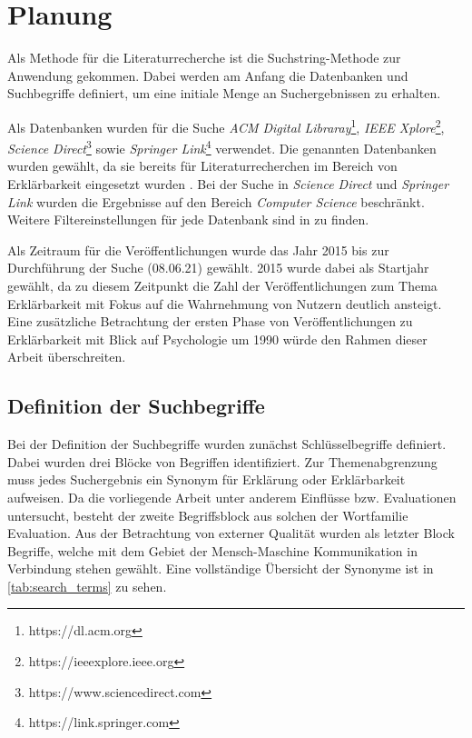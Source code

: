 \section{Planung}

Als Methode für die Literaturrecherche ist die Suchstring-Methode zur Anwendung gekommen. Dabei werden am Anfang die Datenbanken und Suchbegriffe definiert, um eine initiale Menge an Suchergebnissen zu erhalten.

Als Datenbanken wurden für die Suche \textit{ACM Digital Libraray}\footnote{https://dl.acm.org}, \textit{IEEE Xplore}\footnote{https://ieeexplore.ieee.org}, \textit{Science Direct}\footnote{https://www.sciencedirect.com} sowie \textit{Springer Link}\footnote{https://link.springer.com} verwendet. Die genannten Datenbanken wurden gewählt, da sie bereits für Literaturrecherchen im Bereich von Erklärbarkeit eingesetzt wurden \cite{nunes_systematic_2017, carvalho2017quality}. Bei der Suche in \textit{Science Direct} und \textit{Springer Link} wurden die Ergebnisse auf den Bereich \textit{Computer Science} beschränkt. Weitere Filtereinstellungen für jede Datenbank sind in  zu finden.

Als Zeitraum für die Veröffentlichungen wurde das Jahr 2015 bis zur Durchführung der Suche (08.06.21) gewählt. 2015 wurde dabei als Startjahr gewählt, da zu diesem Zeitpunkt die Zahl der Veröffentlichungen zum Thema Erklärbarkeit mit Fokus auf die Wahrnehmung von Nutzern deutlich ansteigt. Eine zusätzliche Betrachtung der ersten Phase von Veröffentlichungen zu Erklärbarkeit mit Blick auf Psychologie um 1990 würde den Rahmen dieser Arbeit überschreiten.

\subsection{Definition der Suchbegriffe}

Bei der Definition der Suchbegriffe wurden zunächst Schlüsselbegriffe definiert. Dabei wurden drei Blöcke von Begriffen identifiziert. Zur Themenabgrenzung muss jedes Suchergebnis ein Synonym für \glqq Erklärung\grqq{} oder \glqq Erklärbarkeit\grqq{} aufweisen. Da die vorliegende Arbeit unter anderem Einflüsse bzw. Evaluationen untersucht, besteht der zweite Begriffsblock aus solchen der Wortfamilie \glqq Evaluation\grqq{}. Aus der Betrachtung von externer Qualität wurden als letzter Block Begriffe, welche mit dem Gebiet der Mensch-Maschine Kommunikation in Verbindung stehen gewählt. Eine vollständige Übersicht der Synonyme ist in \autoref{tab:search_terms} zu sehen.

